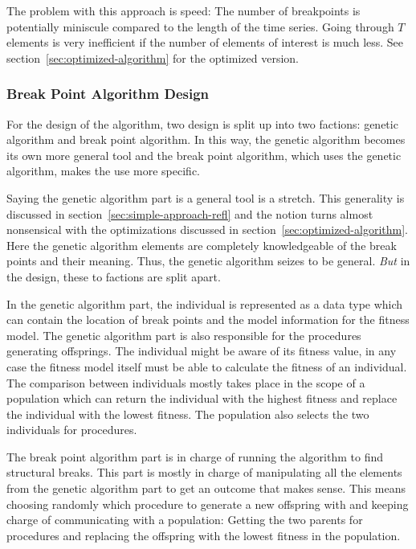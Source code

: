 The problem with this approach is speed: The number of breakpoints is potentially miniscule compared
to the length of the time series. Going through $T$ elements is very
inefficient if the number of elements of interest is much less. See
section~\ref{sec:optimized-algorithm} for the optimized version. 

\subsubsection{Break Point Algorithm Design}

For the design of the algorithm, two design is split up into two factions:
genetic algorithm and break point algorithm. In this way, the genetic algorithm
becomes its own more general tool and the break point algorithm, which uses the
genetic algorithm, makes the use more specific. 

Saying the genetic algorithm part is a general tool is a stretch. This
generality is discussed in section~\ref{sec:simple-approach-refl} and the notion
turns almost nonsensical with the optimizations discussed in
section~\ref{sec:optimized-algorithm}. Here the genetic algorithm elements are
completely knowledgeable of the break points and their meaning. Thus, the
genetic algorithm seizes to be general. \textit{But} in
the design, these to factions are split apart. 

In the genetic algorithm part, the individual is represented as a data type
which can contain the location of break points and the model information for the
fitness model. The genetic algorithm part is also responsible for the procedures
generating offsprings. The individual might be aware of its fitness value, in
any case the fitness model itself must be able to calculate the fitness of an
individual. The comparison between individuals mostly takes place in the scope
of a population which can return the individual with the highest fitness and
replace the individual with the lowest fitness. The population also selects the
two individuals for procedures. 

The break point algorithm part is in charge of running the algorithm to find
structural breaks. This part is mostly in charge of manipulating all the
elements from the genetic algorithm part to get an outcome that makes sense.
This means choosing randomly which procedure to generate a new offspring with
and keeping charge of communicating with a population: Getting the two parents
for procedures and replacing the offspring with the lowest fitness in the
population.  

